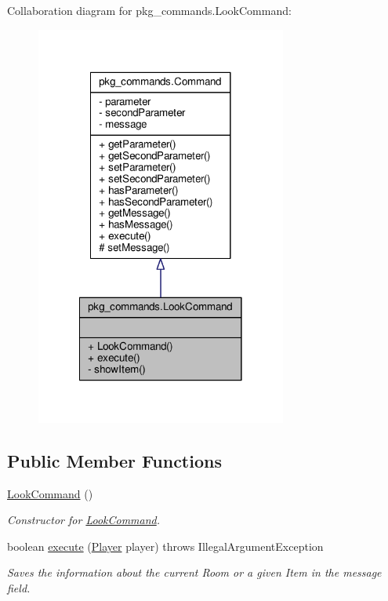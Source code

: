 Collaboration diagram for pkg\-\_\-commands.\-Look\-Command\-:
\nopagebreak
\begin{figure}[H]
\begin{center}
\leavevmode
\includegraphics[width=234pt]{classpkg__commands_1_1LookCommand__coll__graph}
\end{center}
\end{figure}
\subsection*{Public Member Functions}
\begin{DoxyCompactItemize}
\item 
\hyperlink{classpkg__commands_1_1LookCommand_ab689f51a18ea2d40ab995099e076112c}{Look\-Command} ()
\begin{DoxyCompactList}\small\item\em Constructor for \hyperlink{classpkg__commands_1_1LookCommand}{Look\-Command}. \end{DoxyCompactList}\item 
boolean \hyperlink{classpkg__commands_1_1LookCommand_af336146fae1e14bf434d85a5acbcdcd7}{execute} (\hyperlink{classpkg__world_1_1Player}{Player} player)  throws Illegal\-Argument\-Exception 
\begin{DoxyCompactList}\small\item\em Saves the information about the current Room or a given Item in the message field. \end{DoxyCompactList}\end{DoxyCompactItemize}
